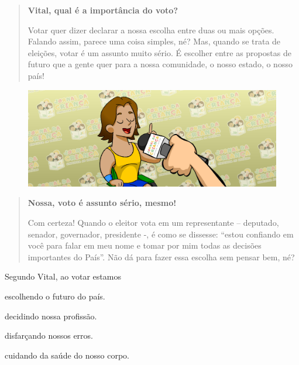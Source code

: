 \begin{quote}
\textbf{Vital, qual é a importância do voto?}

Votar quer dizer declarar a nossa escolha entre duas ou mais opções.
Falando assim, parece uma coisa simples, né? Mas, quando se trata de
eleições, votar é um assunto muito sério. É escolher entre as propostas
de futuro que a gente quer para a nossa comunidade, o nosso estado, o
nosso país!
\end{quote}

\begin{figure}[htpb!]
\includegraphics[width=\textwidth]{./imgs/img51.png}
\end{figure}

\begin{quote}
\noindent\textbf{Nossa, voto é assunto sério, mesmo!}

Com certeza! Quando o eleitor vota em um representante – deputado,
senador, governador, presidente -, é como se dissesse: “estou confiando
em você para falar em meu nome e tomar por mim todas as decisões
importantes do País”. Não dá para fazer essa escolha sem pensar bem,
né?

\end{quote}

Segundo Vital, ao votar estamos

\begin{minipage}{0.5\textwidth}
\begin{escolha}
\item escolhendo o futuro do país.

\item decidindo nossa profissão.

\item disfarçando nossos erros.

\item cuidando da saúde do nosso corpo.
\end{escolha}
\end{minipage}


